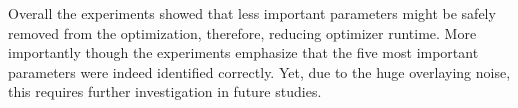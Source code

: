 \documentclass[conference]{IEEEtran}
\begin{document}
Overall the experiments showed that less important parameters might be safely removed from the optimization, therefore, reducing optimizer runtime.
More importantly though the experiments emphasize that the five most important parameters were indeed identified correctly.
Yet, due to the huge overlaying noise, this requires further investigation in future studies.

\end{document}
